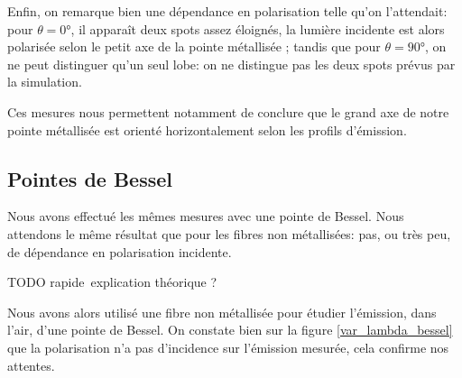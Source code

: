 Enfin, on remarque bien une dépendance en polarisation telle qu'on l'attendait: pour $\theta = 0\si{\degree}$, il apparaît deux spots assez éloignés, la lumière incidente est alors polarisée selon le petit axe de la pointe métallisée ; tandis que pour  $\theta = 90\si{\degree}$, on ne peut distinguer qu'un seul lobe: on ne distingue pas les deux spots prévus par la simulation.

Ces mesures nous permettent notamment de conclure que le grand axe de notre pointe métallisée est orienté horizontalement selon les profils d'émission.





\subsection{Pointes de Bessel}
Nous avons effectué les mêmes mesures avec une pointe de Bessel. Nous attendons le même résultat que pour les fibres non métallisées: pas, ou très peu, de dépendance en polarisation incidente.

TODO rapide explication théorique ?

Nous avons alors utilisé une fibre non métallisée pour étudier l'émission, dans l'air, d'une pointe de Bessel. On constate bien sur la figure \ref{var_lambda_bessel} que la polarisation n'a pas d'incidence sur l'émission mesurée, cela confirme nos attentes.


